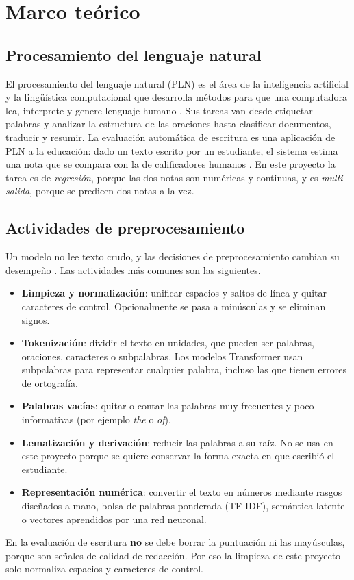 \documentclass[11pt,a4paper]{article}
\begin{document}
\section{Marco teórico}

\subsection{Procesamiento del lenguaje natural}

El procesamiento del lenguaje natural (PLN) es el área de la inteligencia artificial y la lingüística computacional que desarrolla métodos para que una computadora lea, interprete y genere lenguaje humano \citep{hirschberg2015}. Sus tareas van desde etiquetar palabras y analizar la estructura de las oraciones hasta clasificar documentos, traducir y resumir. La evaluación automática de escritura es una aplicación de PLN a la educación: dado un texto escrito por un estudiante, el sistema estima una nota que se compara con la de calificadores humanos \citep{hussein2019,ramesh2022}. En este proyecto la tarea es de \emph{regresión}, porque las dos notas son numéricas y continuas, y es \emph{multi-salida}, porque se predicen dos notas a la vez.

\subsection{Actividades de preprocesamiento}

Un modelo no lee texto crudo, y las decisiones de preprocesamiento cambian su desempeño \citep{uysal2014}. Las actividades más comunes son las siguientes.
\begin{itemize}[nosep]
\item \textbf{Limpieza y normalización}: unificar espacios y saltos de línea y quitar caracteres de control. Opcionalmente se pasa a minúsculas y se eliminan signos.
\item \textbf{Tokenización}: dividir el texto en unidades, que pueden ser palabras, oraciones, caracteres o subpalabras. Los modelos Transformer usan subpalabras para representar cualquier palabra, incluso las que tienen errores de ortografía.
\item \textbf{Palabras vacías}: quitar o contar las palabras muy frecuentes y poco informativas (por ejemplo \emph{the} o \emph{of}).
\item \textbf{Lematización y derivación}: reducir las palabras a su raíz. No se usa en este proyecto porque se quiere conservar la forma exacta en que escribió el estudiante.
\item \textbf{Representación numérica}: convertir el texto en números mediante rasgos diseñados a mano, bolsa de palabras ponderada (TF-IDF), semántica latente o vectores aprendidos por una red neuronal.
\end{itemize}
En la evaluación de escritura \textbf{no} se debe borrar la puntuación ni las mayúsculas, porque son señales de calidad de redacción. Por eso la limpieza de este proyecto solo normaliza espacios y caracteres de control.
\end{document}

